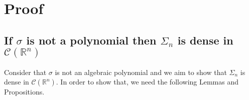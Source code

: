 \documentclass[../main.tex]{subfiles}
\begin{document}
	\section{Proof}
	\subsection{If $\sigma$ is not a polynomial then $\Sigma_n$ is dense in $\mathcal{C}(\mathbb{R}^n)$ }
	\noindent Consider that $\sigma$ is not an algebraic polynomial and we aim to show that $\Sigma_n$ is dense in $\mathcal{C}(\mathbb{R}^n)$. In order to show that, we need the following Lemmas and Propositions. \\ 
\end{document}
